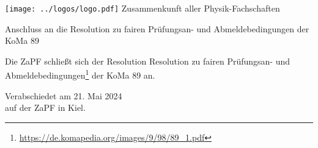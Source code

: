 \documentclass[DIV=calc]{scrartcl}
\let\oldgrqq=\grqq
\def\grqq{\oldgrqq\xspace}
\begin{document}
\hspace{0.87\textwidth}
\begin{minipage}{120pt}
	\vspace{-1.8cm}
	\texttt{[image: ../logos/logo.pdf]}
	\centering
	\small Zusammenkunft aller Physik-Fachschaften
\end{minipage}

\begin{center}
  \huge{Anschluss an die \glqq Resolution zu fairen Prüfungsan- und
Abmeldebedingungen\grqq der KoMa 89}\vspace{.25\baselineskip}\\
  \normalsize
\end{center}
\vspace{1cm}







Die ZaPF schließt sich der Resolution \glqq Resolution zu fairen Prüfungsan- und Abmeldebedingungen\grqq\footnote{\url{https://de.komapedia.org/images/9/98/89_1.pdf}} der KoMa 89 an.


%
\vfill
\begin{flushright}
	Verabschiedet am 21. Mai 2024 \\
	auf der ZaPF in Kiel.
\end{flushright}
\end{document}
